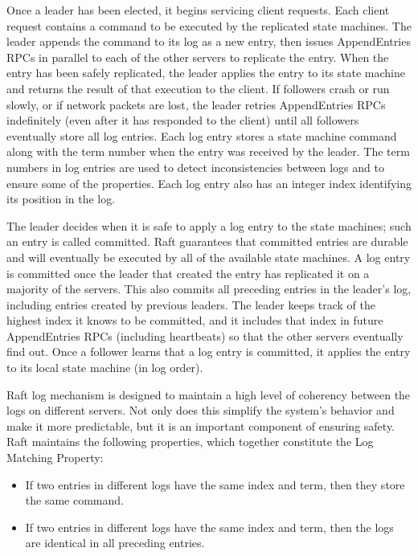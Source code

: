 \documentclass[12pt,letterpaper]{article}
\begin{document}
Once a leader has been elected, it begins servicing client requests. Each client request contains a command to be executed by the replicated state machines. The leader appends the command to its log as a new entry, then issues AppendEntries RPCs in parallel to each of the other servers to replicate the entry. When the entry has been safely replicated, the leader applies the entry to its state machine and returns the result of that execution to the client. If followers crash or run slowly, or if network packets are lost, the leader retries AppendEntries RPCs indefinitely (even after it has responded to the client) until all followers eventually store all log entries. Each log entry stores a state machine command along with the term number when the entry was received by the leader. The term numbers in log entries are used to detect inconsistencies between logs and to ensure some of the properties. Each log entry also has an integer index identifying its position in the log.

The leader decides when it is safe to apply a log entry to the state machines; such an entry is called committed. Raft guarantees that committed entries are durable and will eventually be executed by all of the available state machines. A log entry is committed once the leader that created the entry has replicated it on a majority of the servers. This also commits all preceding entries in the leader’s log, including entries created by previous leaders. The leader keeps track of the highest index it knows to be committed, and it includes that index in future AppendEntries RPCs (including heartbeats) so that the other servers eventually find out. Once a follower learns that a log entry is committed, it applies the entry to its local state machine (in log order).

Raft log mechanism is designed to maintain a high level of coherency between the logs on different servers. Not only does this simplify the system’s behavior and make it more predictable, but it is an important component of ensuring safety. Raft maintains the following properties, which together constitute the Log Matching Property:
\begin{itemize}
    \item If two entries in different logs have the same index and term, then they store the same command.
    \item If two entries in different logs have the same index and term, then the logs are identical in all preceding entries.
\end{itemize}
\end{document}

